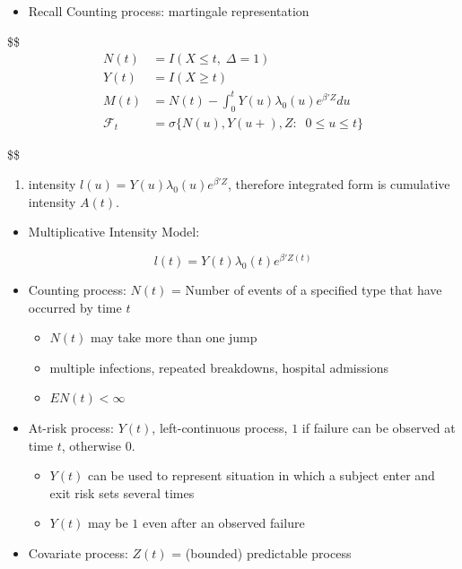 \documentclass[
]{book}
\providecommand{\tightlist}{%
  \setlength{\itemsep}{0pt}\setlength{\parskip}{0pt}}
\begin{document}
{{{\begin{itemize}
\tightlist
\item
  Recall Counting process: martingale representation
\end{itemize}

\$\$
\begin{align}

N(t) &= I(X\le t , \; \Delta = 1)
\\
Y(t) &= I(X \ge t)
\\
M(t) &= N(t) - \int_0^t Y(u)\lambda_0(u) e^{\beta ' Z } du \tag{1}
\\
\mathcal F_t &= \sigma \Big \{ N(u) , Y(u+) , Z: \; \; 0 \le u \le t \Big \}



\end{align}

\$\$

\begin{enumerate}
\def\labelenumi{\arabic{enumi})}
\tightlist
\item
  intensity \(l(u) = Y(u)\lambda_0(u) e^{\beta ' Z }\), therefore integrated form is cumulative intensity \(A(t)\).
\end{enumerate}

\begin{itemize}
\tightlist
\item
  Multiplicative Intensity Model:
\end{itemize}

\[
l(t) = Y(t)\lambda_0(t) e^{\beta ' Z(t) }
\]

\begin{itemize}
\item
  Counting process: \(N(t)\) = Number of events of a specified type that have occurred by time \(t\)

  \begin{itemize}
  \tightlist
  \item
    \(N(t)\) may take more than one jump
  \item
    multiple infections, repeated breakdowns, hospital admissions
  \item
    \(EN(t) < \infty\)
  \end{itemize}
\item
  At-risk process: \(Y(t)\), left-continuous process, \(1\) if failure can be observed at time \(t\), otherwise \(0\).

  \begin{itemize}
  \tightlist
  \item
    \(Y(t)\) can be used to represent situation in which a subject enter and exit risk sets several times
  \item
    \(Y(t)\) may be \(1\) even after an observed failure
  \end{itemize}
\item
  Covariate process: \(Z(t)\) = (bounded) predictable process


\end{itemize}}}}
\end{document}
